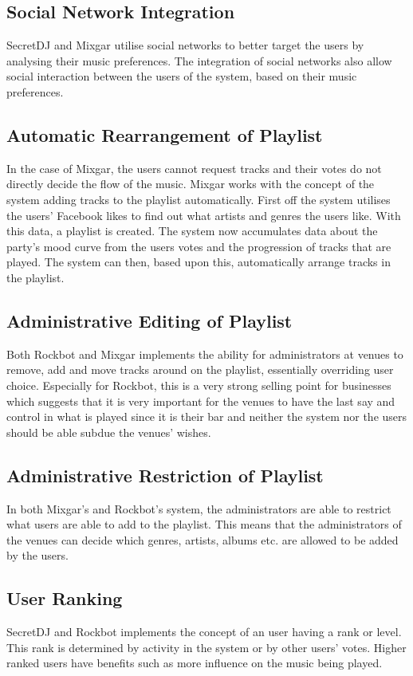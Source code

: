 \subsection{Social Network Integration}
SecretDJ and Mixgar utilise social networks to better target the users by analysing their music preferences. The
integration of social networks also allow social interaction between the users of the system, based on their music preferences.

\subsection{Automatic Rearrangement of Playlist}
\label{sub:auto_rearrange_playlist}
In the case of Mixgar, the users cannot request tracks and their votes
do not directly decide the flow of the music. 
Mixgar works with the concept of the system adding tracks to the playlist
automatically. First off the system utilises the users’ Facebook likes
to find out what artists and genres the users like. With this data, a
playlist is created. The system now accumulates data about the party’s
mood curve from the users votes and the progression of tracks that are played. The system
can then, based upon this, automatically arrange tracks in the
playlist.

\subsection{Administrative Editing of Playlist}
Both Rockbot and
Mixgar implements the ability for administrators at venues to remove, add
and move tracks around on the playlist, essentially overriding user choice. Especially for Rockbot, this
is a very strong selling point for businesses which suggests that it
is very important for the venues to have the last say and control in
what is played since it is their bar and neither the system nor the users
should be able subdue the venues' wishes.

\subsection{Administrative Restriction of Playlist}
In both Mixgar's and Rockbot's system, the administrators are able to
restrict what users are able to add to the playlist. This means that
the administrators of the venues can decide which genres, artists,
albums etc. are allowed to be added by the users.

\subsection{User Ranking}
SecretDJ and Rockbot implements the concept of an user having a rank or
level. This rank is determined by activity in the system or by other
users' votes. Higher ranked users have benefits such as more influence on the music being played.

